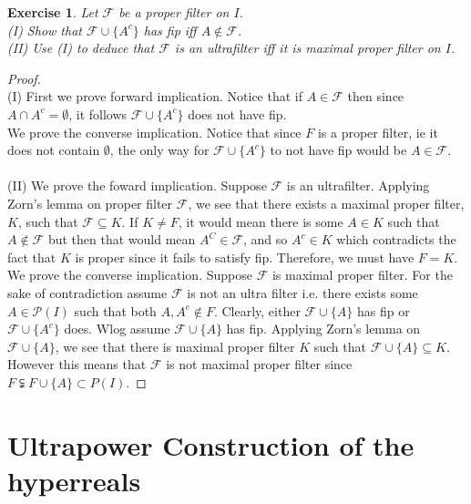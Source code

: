 \documentclass[a4paper, 11pt, openany]{book}
\theoremstyle{plain}
\newtheorem{exercise}{Exercise}[chapter]
\theoremstyle{plain}
\newcommand{\mc}{\mathcal}
\newcommand{\ms}{\mathscr}
\begin{document}
  \begin{exercise}
    Let $\mc{F}$ be a proper filter on $I$. \\
    (I) Show that $\mc{F} \cup \{A^c\}$ has fip iff $A \notin \mc{F}$. \\
    (II) Use (I) to deduce that $\mc{F}$ is an ultrafilter iff it is maximal proper filter on $I$.
  \end{exercise}
  \begin{proof} $ $ \\
    (I) First we prove forward implication. Notice that if $A \in \mc{F}$ then since $A \cap A^c=\emptyset$, it follows $\mc{F} \cup \{A^c\}$ does not have fip. \\
    We prove the converse implication. Notice that since $F$ is a proper filter, ie it does not contain $\emptyset$, the only way for $\mc{F} \cup \{A^c\}$ to not have fip would be $A \in \mc{F}$. \\\\

    (II) We prove the foward implication. Suppose $\mc{F}$ is an ultrafilter. Applying Zorn's lemma on proper filter $\mc{F}$, we see that there exists a maximal proper filter, $K$, such that $\mc{F} \subseteq K$. If $K \not = F$, it would mean there is some $A \in K$ such that $A \not \in \mc{F}$ but then that would mean $A^C \in \mc{F}$, and so $A^c \in K$ which contradicts the fact that $K$ is proper since it fails to satisfy fip. Therefore, we must have $F=K$. \\

    We prove the converse implication. Suppose $\mc{F}$ is maximal proper filter. For the sake of contradiction assume $\mc{F}$ is not an ultra filter i.e. there exists some $A \in \ms{P}(I)$ such that both $A, A^c \notin F$. Clearly, either $\mc{F} \cup \{A\}$ has fip or $\mc{F} \cup \{A^c\}$ does. Wlog assume $\mc{F} \cup \{A\}$ has fip. Applying Zorn's lemma on $\mc{F} \cup \{A\}$, we see that there is maximal proper filter $K$ such that $\mc{F} \cup \{A\} \subseteq K$. However this means that $\mc{F}$ is not maximal proper filter since $F \subsetneqq F \cup \{A\} \subset P(I)$.
  \end{proof}

\chapter{Ultrapower Construction of the hyperreals}
\end{document}
